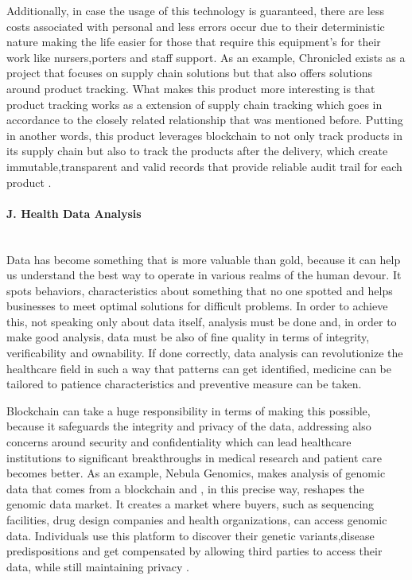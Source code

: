 Additionally, in case the usage of this technology is guaranteed, there are less costs associated with personal and less errors occur due to their deterministic nature making the life easier for those that require this equipment's for their work like nursers,porters and staff support.
As an example, Chronicled exists as a project that focuses on supply chain solutions but that also offers solutions around product tracking. What makes this product more interesting is that product tracking works as a extension of supply chain tracking which goes in accordance to the closely related relationship that was mentioned before. Putting in another words, this product leverages blockchain to not only track products in its supply chain but also to track the products after the delivery, which create immutable,transparent and valid records that provide reliable audit trail for each product \cite{chronicled}.

\paragraph{J. Health Data Analysis} \mbox{}\\
Data has become something that is more valuable than gold, because it can help us understand the best way to operate in various realms of the human devour. It spots behaviors, characteristics about something that no one spotted and helps businesses to meet optimal solutions for difficult problems. In order to achieve this, not speaking only about data itself, analysis must be done and, in order to make good analysis, data must be also of fine quality in terms of integrity, verificability and ownability. 
If done correctly, data analysis can revolutionize the healthcare field in such a way that patterns can get identified, medicine can be tailored to patience characteristics and preventive measure can be taken. 

Blockchain can take a huge responsibility in terms of making this possible, because it safeguards the integrity and privacy of the data, addressing also concerns around security and confidentiality which can lead healthcare institutions to significant breakthroughs in medical research and patient care becomes better.
As an example, Nebula Genomics, makes analysis of genomic data that comes from a blockchain and , in this precise way, reshapes the genomic data market. It creates a market where buyers, such as sequencing facilities, drug design companies and health organizations, can access genomic data. Individuals use this platform to discover their genetic variants,disease predispositions and get compensated by allowing third parties to access their data, while still maintaining privacy \cite{potential-blockchain-tech}.